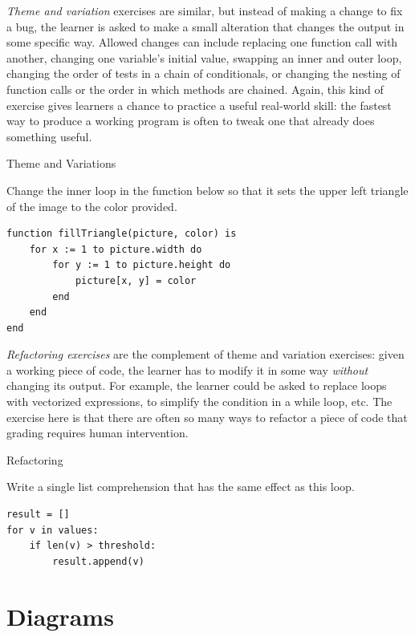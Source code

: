 \emph{Theme and variation} exercises are similar, but instead of
making a change to fix a bug, the learner is asked to make a small
alteration that changes the output in some specific way.  Allowed
changes can include replacing one function call with another, changing
one variable's initial value, swapping an inner and outer loop,
changing the order of tests in a chain of conditionals, or changing
the nesting of function calls or the order in which methods are
chained.  Again, this kind of exercise gives learners a chance to
practice a useful real-world skill: the fastest way to produce a
working program is often to tweak one that already does something
useful.

\begin{callout}{Theme and Variations}

  Change the inner loop in the function below so that it sets the
  upper left triangle of the image to the color provided.

\begin{verbatim}
function fillTriangle(picture, color) is
    for x := 1 to picture.width do
        for y := 1 to picture.height do
            picture[x, y] = color
        end
    end
end
\end{verbatim}

\end{callout}

\emph{Refactoring exercises} are the complement of theme and variation
exercises: given a working piece of code, the learner has to modify it
in some way \emph{without} changing its output. For example, the
learner could be asked to replace loops with vectorized expressions,
to simplify the condition in a while loop, etc. The exercise here is
that there are often so many ways to refactor a piece of code that
grading requires human intervention.

\begin{callout}{Refactoring}

  Write a single list comprehension that has the same effect as this
  loop.

\begin{verbatim}
result = []
for v in values:
    if len(v) > threshold:
        result.append(v)
\end{verbatim}

\end{callout}

\section{Diagrams}\label{s:exercises-diagrams}

